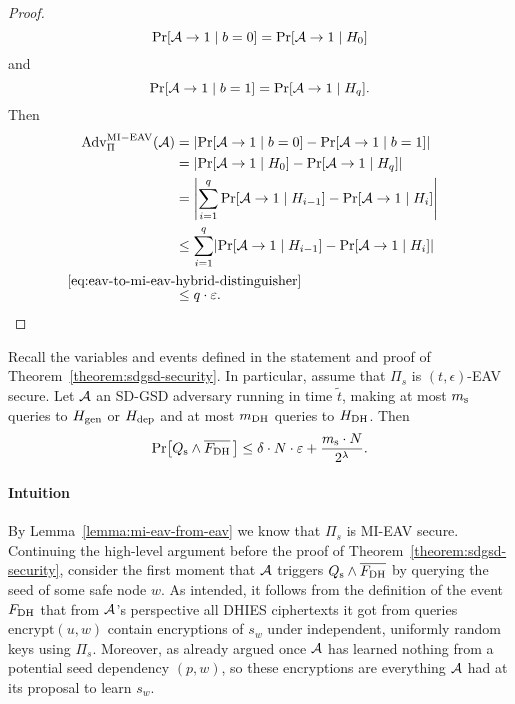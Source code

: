 \begin{proof}
	\[
		\pr{\adv \rightarrow 1 \mid b = 0} = \pr{\adv \rightarrow 1 \mid H_0}
	\]
	and
	\[
		\pr{\adv \rightarrow 1 \mid b = 1} = \pr{\adv \rightarrow 1 \mid H_q}.
	\]
	Then
	\begin{align*}
		\mathrm{Adv}_{\Pi}^{\mathrm{MI-EAV}}(\adv) & = \abs*{\pr{\adv \rightarrow 1 \mid b = 0} - \pr{\adv \rightarrow 1 \mid b = 1}}                      \\
		                                           & = \abs*{\pr{\adv \rightarrow 1 \mid H_0} - \pr{\adv \rightarrow 1 \mid H_q}}                          \\
		                                           & = \abs*{\sum_{i = 1}^{q} \pr{\adv \rightarrow 1 \mid H_{i - 1}} - \pr{\adv \rightarrow 1 \mid H_i}}   \\
		                                           & \le \sum_{i = 1}^{q} \abs*{\pr{\adv \rightarrow 1 \mid H_{i - 1}} - \pr{\adv \rightarrow 1 \mid H_i}} \\
		                                           & \stackrel{\mathclap{\eqref{eq:eav-to-mi-eav-hybrid-distinguisher}}}{\le} q \cdot \epsilon.
	\end{align*}
\end{proof}

\begin{lemma} \label{lemma:eav-reduction}
	Recall the variables and events defined in the statement and proof of Theorem~\ref{theorem:sdgsd-security}. In particular, assume that $\Pi_s$ is $(t, \epsilon)$-EAV secure. Let $\mathcal{A}$ an SD-GSD adversary running in time $\tilde{t}$, making at most $m_\mathrm{s}$ queries to $H_\mathrm{gen}$ or $H_\mathrm{dep}$ and at most $m_\mathrm{DH}$ queries to $H_\mathrm{DH}$. Then
	\[
		\pr{\qs \land \overline{\fdh}\,} \le \delta \cdot N \cdot \epsilon + \frac{\ms \cdot N}{2^\lambda}.
	\]
\end{lemma}

\paragraph{Intuition} By Lemma~\vref{lemma:mi-eav-from-eav} we know that $\Pi_s$ is MI-EAV secure. Continuing the high-level argument before the proof of Theorem~\ref{theorem:sdgsd-security}, consider the first moment that $\mathcal{A}$ triggers $Q_\mathrm{s} \land \overline{F_\mathrm{DH}}$ by querying the seed of some safe node $w$.  As intended, it follows from the definition of the event $F_\mathrm{DH}$ that from $\mathcal{A}$'s perspective all DHIES ciphertexts it got from queries $\mathrm{encrypt}(u, w)$ contain encryptions of $s_w$ under independent, uniformly random keys using $\Pi_s$. Moreover, as already argued once $\mathcal{A}$ has learned nothing from a potential seed dependency $(p, w)$, so these encryptions are everything $\mathcal{A}$ had at its proposal to learn $s_w$.

